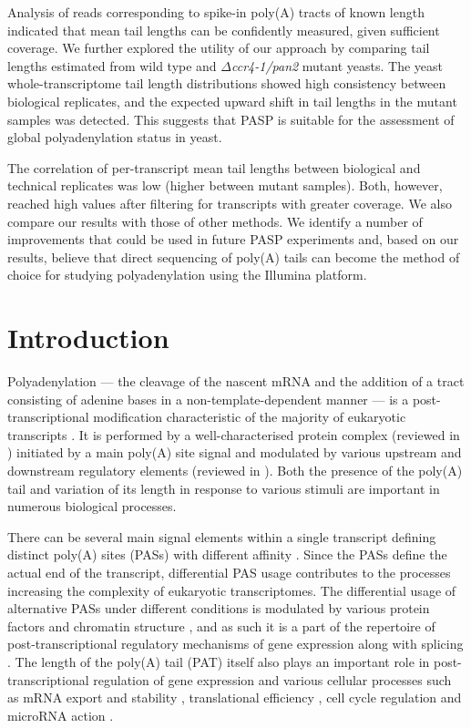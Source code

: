 \documentclass[10pt]{article}
\begin{document}
Analysis of reads corresponding to spike-in poly(A) tracts of known length indicated that mean tail lengths can be confidently measured, given sufficient coverage. We further explored the utility of our approach by comparing tail lengths estimated from wild type and \textit{$\Delta$ccr4-1/pan2} mutant yeasts. The yeast whole-transcriptome tail length distributions showed high consistency between biological replicates, and the expected upward shift in tail lengths in the mutant samples was detected. This suggests that PASP is suitable for the assessment of global polyadenylation status in yeast.

The correlation of per-transcript mean tail lengths between biological and technical replicates was low (higher between mutant samples). Both, however, reached high values after filtering for transcripts with greater coverage. We also compare our results with those of other methods. We identify a number of improvements that could be used in future PASP experiments and, based on our results, believe that direct sequencing of poly(A) tails can become the method of choice for studying polyadenylation using the Illumina platform.

\section*{Introduction}

Polyadenylation --- the cleavage of the nascent mRNA and the addition of a tract consisting of adenine bases in a non-template-dependent manner --- is a post-transcriptional modification characteristic of the majority of eukaryotic transcripts \cite{zhao99,elkon13,tian13}. It is performed by a well-characterised protein complex (reviewed in \cite{zhao99}) initiated by a main poly(A) site signal and modulated by various upstream and downstream regulatory elements (reviewed in \cite{tian11,weill12}). Both the presence of the poly(A) tail and variation of its length in response to various stimuli are important in numerous biological processes.

There can be several main signal elements within a single transcript defining distinct poly(A) sites (PASs) with different affinity \cite{tian13,elkon13}. Since the PASs define the actual end of the transcript, differential PAS usage contributes to the processes increasing the complexity of eukaryotic transcriptomes. The differential usage of alternative PASs under different conditions is modulated by various protein factors and chromatin structure \cite{tian13}, and as such it is a part of the repertoire of post-transcriptional regulatory mechanisms of gene expression along with splicing \cite{licatalosi10}. The length of the poly(A) tail (PAT) itself also plays an important role in post-transcriptional regulation of gene expression and various cellular processes such as mRNA export \cite{fuke07} and stability \cite{lackner07,eckmann11,weill12}, translational efficiency \cite{weill12}, cell cycle regulation \cite{mendez01} and microRNA action \cite{moretti12}.
\end{document}
